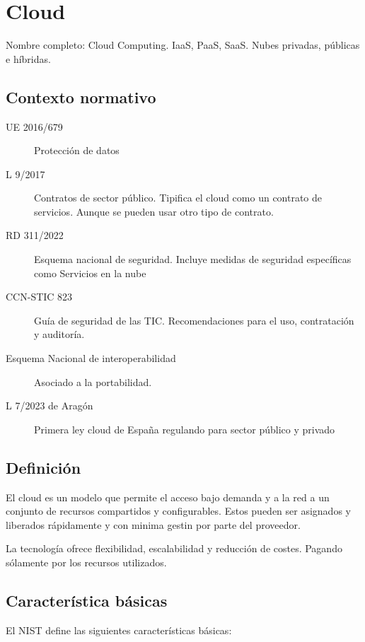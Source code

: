 \setcounter{section}{54} %
\section{Cloud}

Nombre completo: Cloud Computing. IaaS, PaaS, SaaS. Nubes privadas, públicas e híbridas.

\localtableofcontents

\subsection{Contexto normativo}
    \begin{description}
        \item[UE 2016/679] Protección de datos
        \item[L 9/2017] Contratos de sector público. Tipifica el cloud como un contrato de servicios. Aunque se pueden usar otro tipo de contrato.
        \item[RD 311/2022] Esquema nacional de seguridad. Incluye medidas de seguridad específicas como Servicios en la nube
        \item[CCN-STIC 823] Guía de seguridad de las TIC. Recomendaciones para el uso, contratación y auditoría.
        \item[Esquema Nacional de interoperabilidad] Asociado a la portabilidad.
        \item[L 7/2023 de Aragón] Primera ley cloud de España regulando para sector público y privado
    \end{description}

\subsection{Definición}

    El cloud es un modelo que permite el acceso bajo demanda y a  la red a un conjunto de recursos compartidos y configurables. Estos pueden ser asignados y liberados rápidamente y con minima gestin por parte del proveedor.

    La tecnología ofrece flexibilidad, escalabilidad y reducción de costes. Pagando sólamente por los recursos utilizados.

\subsection{Característica básicas}

    El NIST define las siguientes características básicas:

